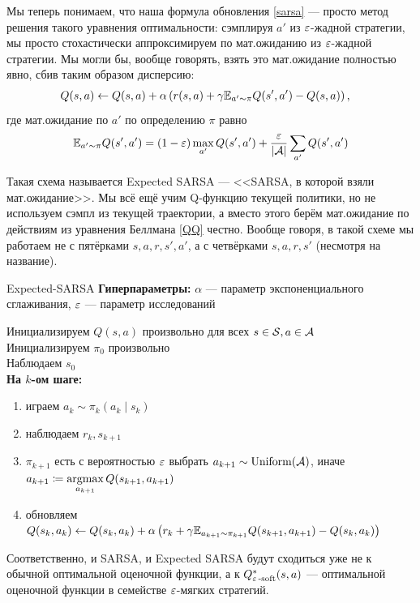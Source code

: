 Мы теперь понимаем, что наша формула обновления \eqref{sarsa} --- просто метод решения такого уравнения оптимальности: сэмплируя $a'$ из $\varepsilon$-жадной стратегии, мы просто стохастически аппроксимируем по мат.ожиданию из $\varepsilon$-жадной стратегии. Мы могли бы, вообще говорять, взять это мат.ожидание полностью явно, сбив таким образом дисперсию:
\begin{align*}\label{expectedsarsa}
Q(s, a) &\leftarrow Q(s, a) + \alpha \left( r(s, a) + \gamma \mathbb{E}_{a' \sim \pi} Q(s', a') - Q(s, a) \right),
\end{align*}
где мат.ожидание по $a'$ по определению $\pi$ равно
$$\mathbb{E}_{a' \sim \pi} Q(s', a') = (1 - \varepsilon) \max_{a'} Q(s', a') + \frac{\varepsilon}{|\mathcal{A}|} \sum_{a'} Q(s', a')$$

Такая схема называется Expected SARSA --- <<SARSA, в которой взяли мат.ожидание>>. Мы всё ещё учим Q-функцию текущей политики, но не используем сэмпл из текущей траектории, а вместо этого берём мат.ожидание по действиям из уравнения Беллмана \eqref{QQ} честно. Вообще говоря, в такой схеме мы работаем не с пятёрками $s, a, r, s', a'$, а с четвёрками $s, a, r, s'$ (несмотря на название).

\begin{algorithm}{Expected-SARSA}
\textbf{Гиперпараметры:} $\alpha$ --- параметр экспоненциального сглаживания, $\varepsilon$ --- параметр исследований

\vspace{0.3cm}
Инициализируем $Q(s, a)$ произвольно для всех $s \in \mathcal{S}, a \in \mathcal{A}$ \\
Инициализируем $\pi_0$ произвольно \\
Наблюдаем $s_0$ \\
\textbf{На $k$-ом шаге:}
\begin{enumerate}
    \item играем $a_k \sim \pi_k(a_k \mid s_k)$
    \item наблюдаем $r_k, s_{k+1}$
    \item $\pi_{k+1}$ есть с вероятностью $\varepsilon$ выбрать $a_{k+1} \sim \operatorname{Uniform}(\mathcal{A})$, иначе $a_{k+1} \coloneqq \mathop{\mathrm{argmax}}\limits_{a_{k+1}} Q(s_{k+1}, a_{k+1})$
    \item обновляем $Q(s_k, a_k) \leftarrow Q(s_k, a_k) + \alpha \left( r_k + \gamma \mathbb{E}_{a_{k+1} \sim \pi_{k+1}}Q(s_{k+1}, a_{k+1}) - Q(s_k, a_k) \right)$
\end{enumerate}
\end{algorithm}

Соответственно, и SARSA, и Expected SARSA будут сходиться уже не к обычной оптимальной оценочной функции, а к $Q^*_{\varepsilon\operatorname{-soft}}(s, a)$ --- оптимальной оценочной функции в семействе $\varepsilon$-мягких стратегий.

